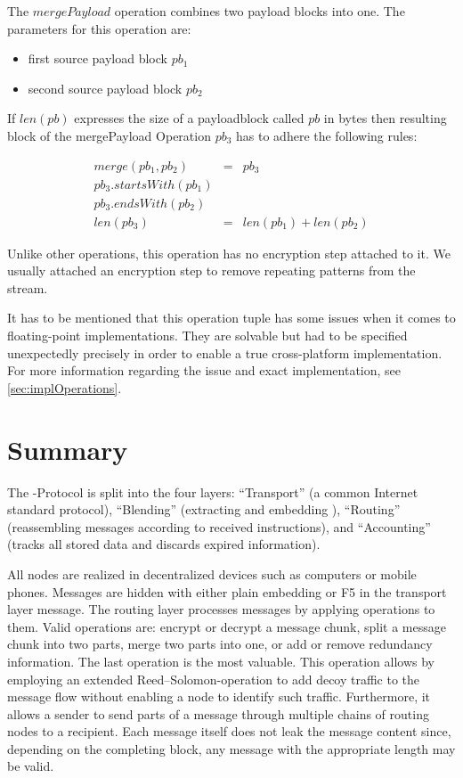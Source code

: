 The $mergePayload$ operation combines two payload blocks into one. The parameters for this operation are:

\begin{itemize}
	\item first source payload block $pb_1$
	\item second source payload block $pb_2$
\end{itemize}

If $len(pb)$ expresses the size of a payloadblock called $pb$ in bytes then resulting block of the mergePayload Operation $pb_3$ has to adhere the following rules:

\begin{eqnarray}
	merge(pb_1, pb_2) & = & pb_3 \\
	pb_3.startsWith(pb_1)\\
	pb_3.endsWith(pb_2)\\
	len(pb_3) & = & len(pb_1) + len(pb_2)
\end{eqnarray}

Unlike other operations, this operation has no encryption step attached to it. We usually attached an encryption step to remove repeating patterns from the \VortexMessage{} stream.

It has to be mentioned that this operation tuple has some issues when it comes to floating-point implementations. They are solvable but had to be specified unexpectedly precisely in order to enable a true cross-platform implementation. For more information regarding the issue and exact implementation, see \cref{sec:implOperations}.


\section{Summary}
The \MessageVortex{}-Protocol is split into the four layers: ``Transport'' (a common Internet standard protocol), ``Blending'' (extracting and embedding \VortexMessages), ``Routing'' (reassembling messages according to received instructions), and ``Accounting'' (tracks all stored data and discards expired information).

All nodes are realized in decentralized devices such as computers or mobile phones. Messages are hidden with either plain embedding or F5 in the transport layer message. The routing layer processes messages by applying operations to them. Valid operations are: encrypt or decrypt a message chunk, split a message chunk into two parts, merge two parts into one, or add or remove redundancy information. The last operation is the most valuable. This operation allows by employing an extended Reed--Solomon-operation to add decoy traffic to the message flow without enabling a node to identify such traffic. Furthermore, it allows a sender to send parts of a message through multiple chains of routing nodes to a recipient. Each message itself does not leak the message content since, depending on the completing block, any message with the appropriate length may be valid.

